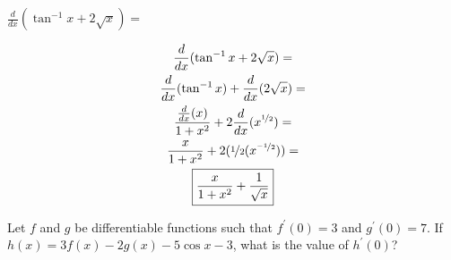 \documentclass[12pt,letterpaper, onecolumn]{exam}
\begin{document}
\begin{questions}

\question $\frac{d}{dx} ( \tan^{-1} x + 2 \sqrt{x} ) = $	


    \begin{solution}
          \begin{gather*}
		\frac{d}{dx} ( \tan^{-1} x + 2 \sqrt{x} )  = \\ 
		\frac{d}{dx} ( \tan^{-1} x ) + \frac{d}{dx} ( 2 \sqrt{x} ) = \\
		\frac{\frac{d}{dx}(x)}{1+x^2} + 2 \frac{d}{dx} ( x^{\nicefrac{1}{2}} ) = \\
		\frac{x}{1+x^2} + 2 (\nicefrac{1}{2}(x^{\nicefrac{-1}{2}})) = \\
		\boxed{\frac{x}{1+x^2} + \frac{1}{\sqrt{x}}}
	\end{gather*}
    \end{solution}
    

\question Let $f$ and $g$ be differentiable functions such that $f^\prime(0)=3$ and $g^\prime (0) = 7$. If $h(x)=3f(x)-2g(x)-5\cos x -3$, what is the value of $h^\prime(0)$?

    \begin{parts}

\end{parts}
\end{questions}
\end{document}
